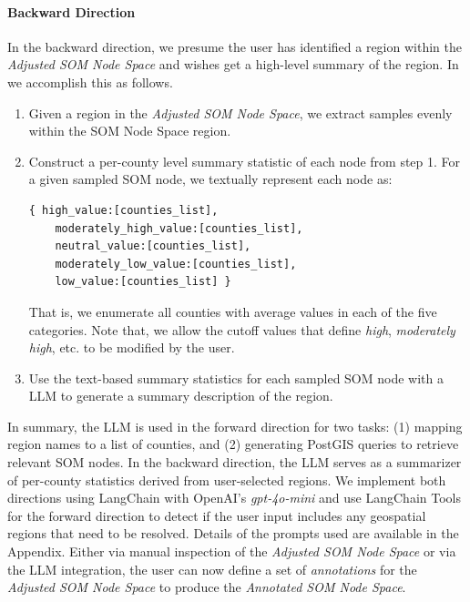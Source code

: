 \paragraph{Backward Direction}
In the backward direction, we presume the user has identified a region within the \textit{Adjusted SOM Node Space} and wishes get a high-level summary of the region. 
%
In \ClimateSOM we accomplish this as follows.
\begin{enumerate}[nolistsep]
    \item Given a region in the \textit{Adjusted SOM Node Space}, we extract samples evenly within the SOM Node Space region. 
    \item Construct a per-county level summary statistic of each node from step 1. For a given sampled SOM node, we textually represent each node as: \begin{verbatim} 
{ high_value:[counties_list], 
    moderately_high_value:[counties_list],
    neutral_value:[counties_list],
    moderately_low_value:[counties_list],
    low_value:[counties_list] }
\end{verbatim} 
    That is, we enumerate all counties with average values in each of the five categories.
    Note that, we allow the cutoff values that define \textit{high}, \textit{moderately high}, etc. to be modified by the user.
    \item Use the text-based summary statistics for each sampled SOM node with a LLM to generate a summary description of the region.
\end{enumerate}

\vspace{3pt}
\noindent
In summary, the LLM is used in the forward direction for two tasks: (1) mapping region names to a list of counties, and (2) generating PostGIS queries to retrieve relevant SOM nodes. In the backward direction, the LLM serves as a summarizer of per-county statistics derived from user-selected regions.
%
We implement both directions using LangChain \cite{langchainLangChain} with OpenAI's \textit{gpt-4o-mini}\cite{achiam2023gpt} and use LangChain Tools for the forward direction to detect if the user input includes any geospatial regions that need to be resolved.
%
Details of the prompts used are available in the Appendix.
%
Either via manual inspection of the \textit{Adjusted SOM Node Space} or via the LLM integration, the user can now define a set of \textit{annotations} for the \textit{Adjusted SOM Node Space} to produce the \textit{Annotated SOM Node Space}.

